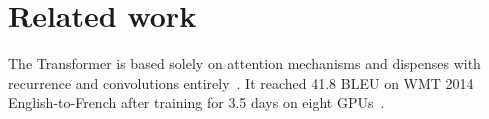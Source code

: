 \documentclass{article}
\begin{document}
\section{Related work}
The Transformer is based solely on attention mechanisms and dispenses with recurrence and convolutions entirely~\cite{vaswani2017attention}.
It reached 41.8 BLEU on WMT 2014 English-to-French after training for 3.5 days on eight GPUs~\cite{vaswani2017attention}.


\end{document}

